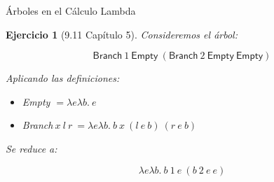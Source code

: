\documentclass[11pt]{beamer}
\newtheorem{exercise}{Ejercicio}
\begin{document}
\begin{frame}{Árboles en el Cálculo Lambda}
	\begin{exercise}[9.11 Capítulo 5]
		Consideremos el árbol:
		
		\[
		\textsf{Branch}\ 1\ \textsf{Empty}\ (\textsf{Branch}\ 2\ \textsf{Empty}\ \textsf{Empty})
		\]
		
		Aplicando las definiciones:
		
		\begin{itemize}
			\item \textsf{Empty} $= \lambda e\lambda b.\ e$
			\item \textsf{Branch}$\ x \ l \ r \ = \lambda e\lambda b.\ b\ x\ (l\ e\ b)\ (r\ e\ b)$
		\end{itemize}
		
		Se reduce a:
		
		\[
		\lambda e\lambda b.\ b\ 1\ e\ (b\ 2\ e\ e)
		\]
		
	\end{exercise}
\end{frame}
\end{document}
